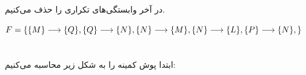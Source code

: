 \documentclass{article}
\begin{document}
در آخر وابستگی‌های تکراری را حذف می‌کنیم.
\begin{latin}
$
F=\\
\{\\
	\{M\}\longrightarrow\{Q\},\\
	\{Q\}\longrightarrow\{N\},\\
	\{N\}\longrightarrow\{M\},\\
	\{N\}\longrightarrow\{L\},\\
	\{P\}\longrightarrow\{N\},\\
\}
$
\end{latin}


\section{}%
ابتدا پوش کمینه را به شکل زیر محاسبه می‌کنیم:
\end{document}
